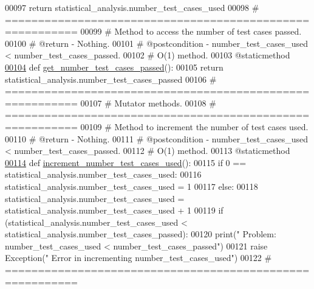 \begin{DoxyCode}
00097         \textcolor{keywordflow}{return} statistical\_analysis.number\_test\_cases\_used
00098     \textcolor{comment}{# =========================================================}
00099     \textcolor{comment}{#   Method to access the number of test cases passed.}
00100     \textcolor{comment}{#   @return - Nothing.}
00101     \textcolor{comment}{#   @postcondition - number\_test\_cases\_used < number\_test\_cases\_passed.}
00102     \textcolor{comment}{#   O(1) method.}
00103     @staticmethod
\hypertarget{test__statistics_8py_source_l00104}{}\hyperlink{classstatistics_1_1test__statistics_1_1statistical__analysis_a0461b276e37fd6c24ab919efbeb04309}{00104}     \textcolor{keyword}{def }\hyperlink{classstatistics_1_1test__statistics_1_1statistical__analysis_a0461b276e37fd6c24ab919efbeb04309}{get\_number\_test\_cases\_passed}():
00105         \textcolor{keywordflow}{return} statistical\_analysis.number\_test\_cases\_passed
00106     \textcolor{comment}{# =========================================================}
00107     \textcolor{comment}{#   Mutator methods.}
00108     \textcolor{comment}{# =========================================================}
00109     \textcolor{comment}{#   Method to increment the number of test cases used.}
00110     \textcolor{comment}{#   @return - Nothing.}
00111     \textcolor{comment}{#   @postcondition - number\_test\_cases\_used < number\_test\_cases\_passed.}
00112     \textcolor{comment}{#   O(1) method.}
00113     @staticmethod
\hypertarget{test__statistics_8py_source_l00114}{}\hyperlink{classstatistics_1_1test__statistics_1_1statistical__analysis_a7e88e87c8e6739dcaa37740985089f11}{00114}     \textcolor{keyword}{def }\hyperlink{classstatistics_1_1test__statistics_1_1statistical__analysis_a7e88e87c8e6739dcaa37740985089f11}{increment\_number\_test\_cases\_used}():
00115         \textcolor{keywordflow}{if} 0 == statistical\_analysis.number\_test\_cases\_used:
00116             statistical\_analysis.number\_test\_cases\_used = 1
00117         \textcolor{keywordflow}{else}:
00118             statistical\_analysis.number\_test\_cases\_used = statistical\_analysis.number\_test\_cases\_used + 1
00119         \textcolor{keywordflow}{if} (statistical\_analysis.number\_test\_cases\_used < statistical\_analysis.number\_test\_cases\_passed):
00120             print(\textcolor{stringliteral}{" Problem: number\_test\_cases\_used < number\_test\_cases\_passed"})
00121             \textcolor{keywordflow}{raise} Exception(\textcolor{stringliteral}{"   Error in incrementing number\_test\_cases\_used"})
00122     \textcolor{comment}{# =========================================================}

\end{DoxyCode}
